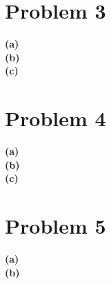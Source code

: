 \documentclass[fleqn]{article}
\begin{document}
\begin{adjustwidth}{-2cm}{-2cm}
\section{Problem 3}
\textbf{(a)}\\
\textbf{(b)}\\
\textbf{(c)}\\

\section{Problem 4}
\textbf{(a)}\\
\textbf{(b)}\\
\textbf{(c)}\\

\section{Problem 5}
\textbf{(a)}\\
\textbf{(b)}\\

\end{adjustwidth}
\end{document}
